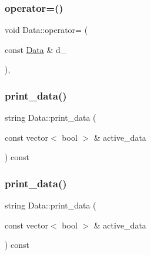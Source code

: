 \mbox{\label{classData_a4af8ede7697476321f80686ca5576228}} 
\subsubsection{\texorpdfstring{operator=()}{operator=()}\hspace{0.1cm}{\footnotesize\ttfamily [2/2]}}
{\footnotesize\ttfamily void Data\+::operator= (\begin{DoxyParamCaption}\item[{const \mbox{\hyperlink{classData}{Data}} \&}]{d\+\_\+ }\end{DoxyParamCaption})\hspace{0.3cm}{\ttfamily [inline]}, {\ttfamily [protected]}}

\mbox{\label{classData_a8663c7e41a90bdc730ff8b6cbe046c52}} 
\subsubsection{\texorpdfstring{print\_data()}{print\_data()}\hspace{0.1cm}{\footnotesize\ttfamily [1/4]}}
{\footnotesize\ttfamily string Data\+::print\+\_\+data (\begin{DoxyParamCaption}\item[{const vector$<$ bool $>$ \&}]{active\+\_\+data }\end{DoxyParamCaption}) const}

\mbox{\label{classData_a8663c7e41a90bdc730ff8b6cbe046c52}} 
\subsubsection{\texorpdfstring{print\_data()}{print\_data()}\hspace{0.1cm}{\footnotesize\ttfamily [2/4]}}
{\footnotesize\ttfamily string Data\+::print\+\_\+data (\begin{DoxyParamCaption}\item[{const vector$<$ bool $>$ \&}]{active\+\_\+data }\end{DoxyParamCaption}) const}

